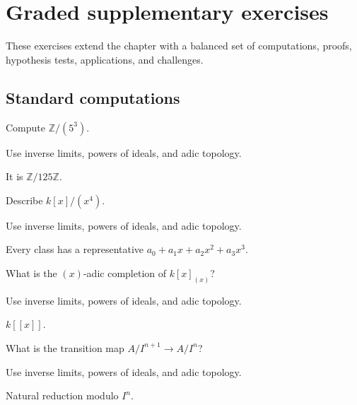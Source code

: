 \section{Graded supplementary exercises}
These exercises extend the chapter with a balanced set of computations, proofs, hypothesis tests, applications, and challenges.

\subsection*{Standard computations}

\begin{exercise}\label{exr:v18-expand-01}
Compute $\mathbb Z/(5^3)$.
\end{exercise}
\begin{hint}
Use inverse limits, powers of ideals, and adic topology.
\end{hint}
\begin{solution}
It is $\mathbb Z/125\mathbb Z$.
\end{solution}

\begin{exercise}\label{exr:v18-expand-02}
Describe $k[x]/(x^4)$.
\end{exercise}
\begin{hint}
Use inverse limits, powers of ideals, and adic topology.
\end{hint}
\begin{solution}
Every class has a representative $a_0+a_1x+a_2x^2+a_3x^3$.
\end{solution}

\begin{exercise}\label{exr:v18-expand-03}
What is the $(x)$-adic completion of $k[x]_{(x)}$?
\end{exercise}
\begin{hint}
Use inverse limits, powers of ideals, and adic topology.
\end{hint}
\begin{solution}
$k[[x]]$.
\end{solution}

\begin{exercise}\label{exr:v18-expand-04}
What is the transition map $A/I^{n+1}\to A/I^n$?
\end{exercise}
\begin{hint}
Use inverse limits, powers of ideals, and adic topology.
\end{hint}
\begin{solution}
Natural reduction modulo $I^n$.
\end{solution}


